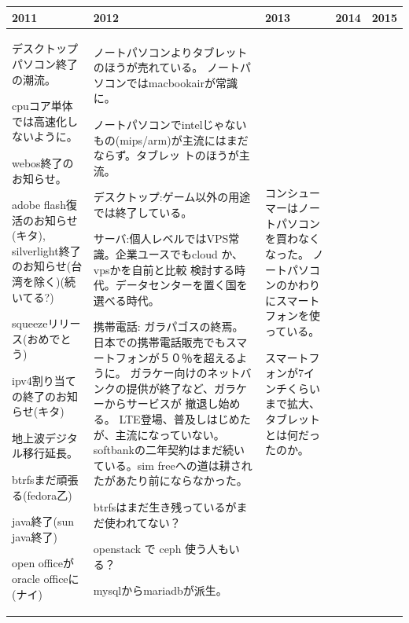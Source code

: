 \documentclass[mingoth,a4paper]{jsarticle}
\begin{document}
{%
\footnotesize
\begin{tabular}[t]{|p{8em}|p{8em}|p{12em}|p{8em}|p{8em}|}
\hline
2011 &2012 & 2013 & 2014 & 2015 \\
\hline

 デスクトップパソコン終了の潮流。

 cpuコア単体では高速化しないように。

 webos終了のお知らせ。

 adobe flash復活のお知らせ(キタ), silverlight終了のお知らせ(台湾を除く)(続いてる?)

 squeezeリリース(おめでとう)

 ipv4割り当ての終了のお知らせ(キタ)

 地上波デジタル移行延長。

 btrfsまだ頑張る(fedora乙)

 java終了(sun java終了)

 open officeがoracle officeに(ナイ)

 &

 ノートパソコンよりタブレットのほうが売れている。
 ノートパソコンではmacbookairが常識に。

 ノートパソコンでintelじゃないもの(mips/arm)が主流にはまだならず。タブレッ
 トのほうが主流。

 デスクトップ:ゲーム以外の用途では終了している。

 サーバ:個人レベルではVPS常識。企業ユースでもcloud か、vpsかを自前と比較
     検討する時代。データセンターを置く国を選べる時代。

 携帯電話:
 ガラパゴスの終焉。日本での携帯電話販売でもスマートフォンが５０％を超えるように。
     ガラケー向けのネットバンクの提供が終了など、ガラケーからサービスが
     撤退し始める。
 LTE登場、普及しはじめたが、主流になっていない。
 softbankの二年契約はまだ続いている。sim freeへの道は耕されたがあたり前にならなかった。

 btrfsはまだ生き残っているがまだ使われてない？

     openstack で ceph 使う人もいる？

 mysqlからmariadbが派生。

 & 

コンシューマーはノートパソコンを買わなくなった。
ノートパソコンのかわりにスマートフォンを使っている。

スマートフォンが7インチくらいまで拡大、タブレットとは何だったのか。


\end{tabular}}
\end{document}
